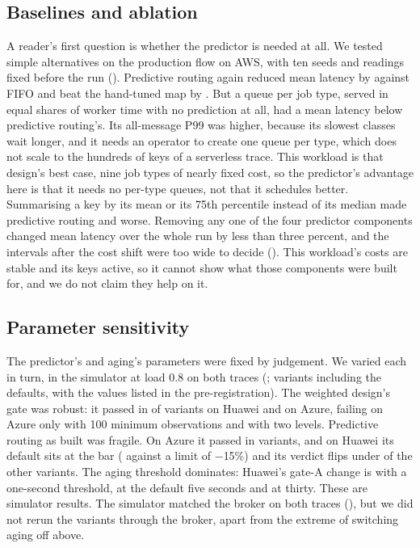 

\subsection{Baselines and ablation}\label{sec:baselines}

A reader's first question is whether the predictor is needed at all. We tested simple alternatives on the production flow on AWS, with ten seeds and readings fixed before the run (). Predictive routing again reduced mean latency by \BaseQOneAbs{} against FIFO and beat the hand-tuned map by \BaseBTwoAbs{}. But a queue per job type, served in equal shares of worker time with no prediction at all, had a mean latency \BasePtfVsPredAbs{} below predictive routing's. Its all-message P99 was \BasePtfPNinetyNineAbs{} higher, because its slowest classes wait longer, and it needs an operator to create one queue per type, which does not scale to the hundreds of keys of a serverless trace. This workload is that design's best case, nine job types of nearly fixed cost, so the predictor's advantage here is that it needs no per-type queues, not that it schedules better. Summarising a key by its mean or its 75th percentile instead of its median made predictive routing \BaseBThreeAbs{} and \BaseBFourAbs{} worse. Removing any one of the four predictor components changed mean latency over the whole run by less than three percent, and the intervals after the cost shift were too wide to decide (). This workload's costs are stable and its keys active, so it cannot show what those components were built for, and we do not claim they help on it.





\subsection{Parameter sensitivity}\label{sec:sensitivity}

The predictor's and aging's parameters were fixed by judgement. We varied each in turn, in the simulator at load 0.8 on both traces (; \SensVariants{} variants including the defaults, with the values listed in the pre-registration). The weighted design's gate was robust: it passed in \SensHuaweiBPassed{} of \SensVariants{} variants on Huawei and \SensAzureBPassed{} on Azure, failing on Azure only with 100 minimum observations and with two levels. Predictive routing as built was fragile. On Azure it passed in \SensAzureAPassed{} variants, and on Huawei its default sits at the bar (\SensHuaweiDefaultA{} against a limit of $-$15\%) and its verdict flips under \SensHuaweiAFlips{} of the other variants. The aging threshold dominates: Huawei's gate-A change is \SensHuaweiAgingAOne{} with a one-second threshold, \SensHuaweiAgingAFive{} at the default five seconds and \SensHuaweiAgingAThirty{} at thirty. These are simulator results. The simulator matched the broker on both traces (), but we did not rerun the variants through the broker, apart from the extreme of switching aging off above.

